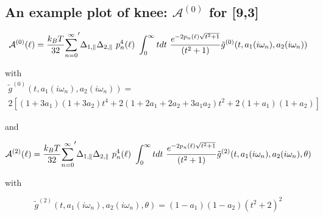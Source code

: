 \documentclass[a4paper]{article}
\begin{document}
\begin{center}
\section{An example plot of knee: $\mathcal{A}^{(0)}$ for [9,3]}
\begin{equation}
{\cal A}^{(0)}(\ell) = \frac{k_BT}{32}  {\sum_{n=0}^{\infty}}' \Delta_{1,\parallel} \Delta_{2,\parallel} ~p_n^{4}(\ell) ~\int_0^{\infty} t dt ~\frac{e^{- 2 p_n(\ell) \sqrt{t^{2} + 1}}}{(t^{2} + 1)} \tilde g^{(0)}(t, a_1(i \omega_n), a_2(i \omega_n))
\end{equation}

with
\begin{multline*}
\tilde g^{(0)}(t, a_1(i \omega_n), a_2(i \omega_n)) = \\ 
2 \left[ (1+3a_1)(1+3a_2) t^{4} + 2 (1+2a_1+2a_2+3a_1a_2) t^{2}  + 2(1+a_1)(1+a_2)\right]
\end{multline*}



and

\begin{equation}
{\cal A}^{(2)}(\ell) = \frac{k_BT}{32}  {\sum_{n=0}^{\infty}}' \Delta_{1,\parallel} \Delta_{2,\parallel} ~p_n^{4}(\ell) ~\int_0^{\infty} t dt ~\frac{e^{- 2 p_n(\ell) \sqrt{t^{2} + 1}}}{(t^{2} + 1)} \tilde g^{(2)}(t, a_1(i \omega_n), a_2(i \omega_n), \theta)
\end{equation}

with

\begin{equation}
\tilde g^{(2)}(t, a_1(i \omega_n), a_2(i \omega_n), \theta) = (1-a_1)(1-a_2)(t^{2} + 2)^2
\label{befgqw}
\end{equation}


\end{center}
\end{document}
